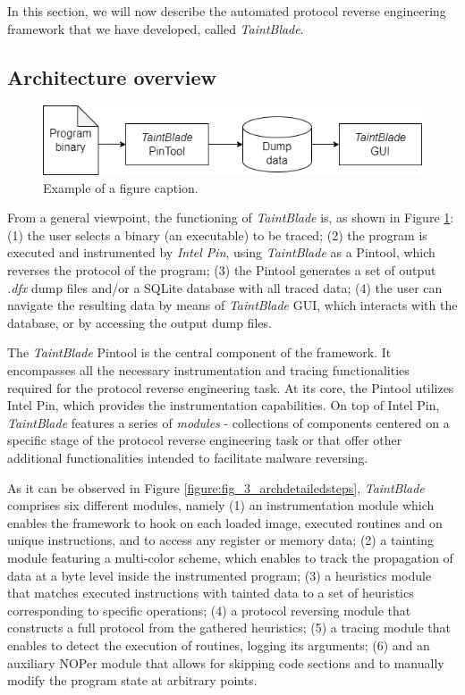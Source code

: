 \documentclass[conference]{IEEEtran}
\begin{document}
In this section, we will now describe the automated protocol reverse
engineering framework that we have developed, called \textit{TaintBlade}.

\subsection{Architecture overview}

\begin{figure}[htbp]
    \centerline{\includegraphics[width=0.9\columnwidth]{images/generalarch.drawio.png}}
    \caption{Example of a figure caption.}
    \label{fig_3_generalarch}
\end{figure}

From a general viewpoint, the functioning of \textit{TaintBlade} is, as shown
in Figure \ref{fig_3_generalarch}: (1) the user selects a binary (an
executable) to be traced; (2) the program is executed and instrumented by
\textit{Intel Pin}, using \textit{TaintBlade} as a Pintool, which reverses the
protocol of the program; (3) the Pintool generates a set of output
\textit{.dfx} dump files and/or a SQLite database with all traced data; (4) the
user can navigate the resulting data by means of \textit{TaintBlade} GUI, which
interacts with the database, or by accessing the output dump files.

The \textit{TaintBlade} Pintool is the central component of the framework. It
encompasses all the necessary instrumentation and tracing functionalities
required for the protocol reverse engineering task. At its core, the Pintool
utilizes Intel Pin, which provides the instrumentation capabilities. On top of
Intel Pin, \textit{TaintBlade} features a series of \textit{modules} -
collections of components centered on a specific stage of the protocol reverse
engineering task or that offer other additional functionalities intended to
facilitate malware reversing.

As it can be observed in Figure \ref{figure:fig_3_archdetailedsteps},
\textit{TaintBlade} comprises six different modules, namely (1) an
instrumentation module which enables the framework to hook on each loaded
image, executed routines and on unique instructions, and to access any register
or memory data; (2) a tainting module featuring a multi-color scheme, which
enables to track the propagation of data at a byte level inside the
instrumented program; (3) a heuristics module that matches executed
instructions with tainted data to a set of heuristics corresponding to specific
operations; (4) a protocol reversing module that constructs a full protocol
from the gathered heuristics; (5) a tracing module that enables to detect the
execution of routines, logging its arguments; (6) and an auxiliary NOPer module
that allows for skipping code sections and to manually modify the program state
at arbitrary points.
\end{document}
